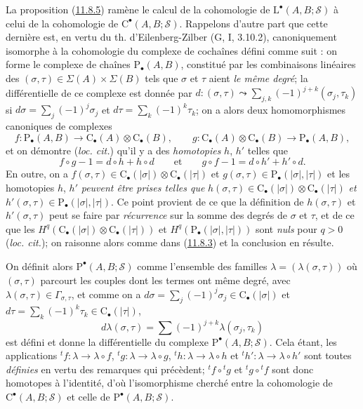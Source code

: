 \begin{env}[11.8.6]
\label{0.11.8.6-fr}
La proposition (\hyperref[0.11.8.5-fr]{11.8.5}) ramène le calcul de la
cohomologie de $\mathrm L^\bullet(A,B;\mathscr S)$ à celui de la cohomologie de
$\mathrm C^\bullet(A,B;\mathscr S)$. Rappelons d'autre part que cette dernière
est, en vertu du th. d'Eilenberg-Zilber (G, I, 3.10.2), canoniquement
isomorphe à la cohomologie du complexe de cochaînes défini comme suit : on
forme le complexe de chaînes $\mathrm P_\bullet(A,B)$, constitué par les
combinaisons linéaires des $(\sigma,\tau)\in\Sigma(A)\times\Sigma(B)$ tels
que $\sigma$ et $\tau$ aient \emph{le même degré}; la différentielle de ce complexe
est donnée par
$d:(\sigma,\tau)\leadsto\sum_{j,k}(-1)^{j+k}(\sigma_j,\tau_k)$ si
$d\sigma=\sum_j(-1)^j\sigma_j$ et $d\tau=\sum_k(-1)^k\tau_k$;
on a alors deux homomorphismes canoniques de complexes
\[
f:\mathrm P_\bullet(A,B)\longrightarrow
\mathrm C_\bullet(A)\otimes\mathrm C_\bullet(B),\qquad
g:\mathrm C_\bullet(A)\otimes\mathrm C_\bullet(B)
\longrightarrow\mathrm P_\bullet(A,B),
\]
et on démontre (\emph{loc. cit.}) qu'il y a des \emph{homotopies} $h$, $h'$ telles
que
\[
f\circ g-1=d\circ h+h\circ d\qquad\text{et}\qquad
g\circ f-1=d\circ h'+h'\circ d.
\]
En outre, on a
$f(\sigma,\tau)\in\mathrm C_\bullet(|\sigma|)
\otimes\mathrm C_\bullet(|\tau|)$ et
$g(\sigma,\tau)\in\mathrm P_\bullet(|\sigma|,|\tau|)$
et les homotopies $h$, $h'$ \emph{peuvent être prises telles que}
$h(\sigma,\tau)\in\mathrm C_\bullet(|\sigma|)
\otimes\mathrm C_\bullet(|\tau|)$ \emph{et}
$h'(\sigma,\tau)\in\mathrm P_\bullet(|\sigma|,|\tau|)$.
Ce point provient de ce que la définition de $h(\sigma,\tau)$ et
$h'(\sigma,\tau)$ peut se faire par \emph{récurrence} sur la somme des degrés de
$\sigma$ et $\tau$, et de ce que les
$H^q(\mathrm C_\bullet(|\sigma|)\otimes\mathrm C_\bullet(|\tau|))$ et
$H^q(\mathrm P_\bullet(|\sigma|,|\tau|))$
sont \emph{nuls} pour $q>0$ (\emph{loc. cit.}); on raisonne alors comme dans
(\hyperref[0.11.8.3-fr]{11.8.3}) et la conclusion en résulte.

On définit alors $\mathrm P^\bullet(A,B;\mathscr S)$ comme l'ensemble des
familles $\lambda=(\lambda(\sigma,\tau))$ où $(\sigma,\tau)$ parcourt les
couples dont les termes ont même degré, avec
$\lambda(\sigma,\tau)\in\Gamma_{\sigma,\tau}$, et comme on a
$d\sigma=\sum_j(-1)^j\sigma_j\in\mathrm C_\bullet(|\sigma|)$ et
$d\tau=\sum_k(-1)^k\tau_k\in\mathrm C_\bullet(|\tau|)$,
\[
d\lambda(\sigma,\tau)=
\sum(-1)^{j+k}\lambda(\sigma_j,\tau_k)
\]
est défini et donne la différentielle du complexe
$\mathrm P^\bullet(A,B;\mathscr S)$. Cela étant, les applications
${}^tf:\lambda\to\lambda\circ f$, ${}^tg:\lambda\to\lambda\circ g$,
${}^th:\lambda\to\lambda\circ h$ et ${}^th':\lambda\to\lambda\circ h'$
sont toutes \emph{définies} en vertu des remarques qui précèdent;
${}^tf\circ{}^tg$ et ${}^tg\circ{}^tf$ sont donc homotopes à
l'identité, d'où l'isomorphisme cherché entre la cohomologie de
$\mathrm C^\bullet(A,B;\mathscr S)$ et celle de
$\mathrm P^\bullet(A,B;\mathscr S)$.
\end{env}

